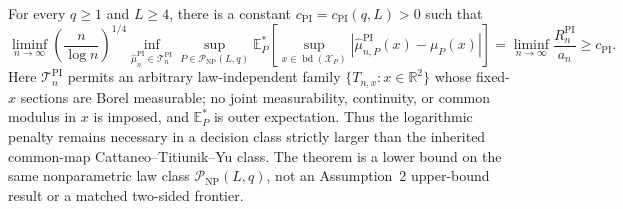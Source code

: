 For every \(q\geq1\) and \(L\geq4\), there is a constant \(c_{\mathrm{PI}}=c_{\mathrm{PI}}(q,L)>0\) such that
\[
 \liminf_{n\to\infty}
 \left(\frac{n}{\log n}\right)^{1/4}
 \inf_{\widehat\mu_n^{\mathrm{PI}}\in\mathcal T_n^{\mathrm{PI}}}
 \sup_{P\in\mathcal P_{\mathrm{NP}}(L,q)}
 \mathbb E_P^*\!\left[
 \sup_{x\in\operatorname{bd}(\mathcal X_P)}
 \left|\widehat\mu_{n,P}^{\mathrm{PI}}(x)-\mu_P(x)\right|
 \right]
 =\liminf_{n\to\infty}\frac{R_n^{\mathrm{PI}}}{a_n}
 \geq c_{\mathrm{PI}}.
\]
Here \(\mathcal T_n^{\mathrm{PI}}\) permits an arbitrary law-independent family \(\{T_{n,x}:x\in\mathbb R^2\}\) whose fixed-\(x\) sections are Borel measurable; no joint measurability, continuity, or common modulus in \(x\) is imposed, and \(\mathbb E_P^*\) is outer expectation.  Thus the logarithmic penalty remains necessary in a decision class strictly larger than the inherited common-map Cattaneo--Titiunik--Yu class.  The theorem is a lower bound on the same nonparametric law class \(\mathcal P_{\mathrm{NP}}(L,q)\), not an Assumption~2 upper-bound result or a matched two-sided frontier.